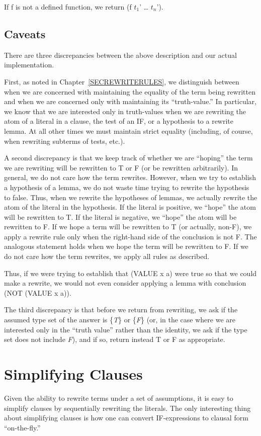 \documentclass[10pt]{book}
\begin{document}
If f is not a defined function, we return (f $t_{1}$' \ldots{} $t_{n}$').

\subsection{Caveats}
There are three discrepancies between the above
description and our actual implementation.

First, as noted in Chapter~\ref{SECREWRITERULES}, we distinguish between when
we are concerned with  maintaining the equality of the term being rewritten
and when we are   concerned only with
maintaining its ``truth-value.''  In particular, we know that we are  interested only
in truth-values when we
are rewriting the atom of a literal in a clause, the test of an IF, or
a hypothesis to a rewrite lemma.  At all other times we must maintain
strict equality (including, of course, when rewriting subterms of
tests, etc.).

A second discrepancy is that we
keep track of whether we are ``hoping'' the term we are rewriting will be
rewritten to T or F (or be rewritten arbitrarily).  In general, we do not
care how the term rewrites.  However, when we try to establish 
a hypothesis of a lemma, we do not waste time trying 
to rewrite the hypothesis to false.
Thus, when we rewrite the hypotheses of lemmas, we actually
rewrite the atom of the literal in the hypothesis.  If the literal is
positive, we ``hope'' the atom will be rewritten to T.  If the literal is
negative, we ``hope'' the atom will be rewritten to F.
If we hope a term will be rewritten to
T (or actually, non-F), we  apply a rewrite rule only 
when the right-hand side of the conclusion is not F.
The analogous statement holds when we hope the term
will be rewritten to F.  If we do not care how the term rewrites, we apply all rules
as described.

Thus, if we were trying to establish that (VALUE x a) were true so
that we could make a rewrite, we would not even consider applying a
lemma with conclusion (NOT (VALUE x a)).

The third discrepancy is that before we return from rewriting, we
ask if the assumed type set of the answer is \{\emph{T}\} or \{\emph{F}\} (or, in the case where we are  interested only
in the ``truth value'' rather than the identity, we ask if the type set
does not include \emph{F}), and if so, return
instead T or F as appropriate.

\section{Simplifying Clauses}
Given the ability to rewrite terms under a set of assumptions,
it is easy to simplify clauses by sequentially rewriting the literals.
The only interesting
thing about simplifying clauses is how
one can convert IF-expressions to clausal form ``on-the-fly.''
\end{document}
